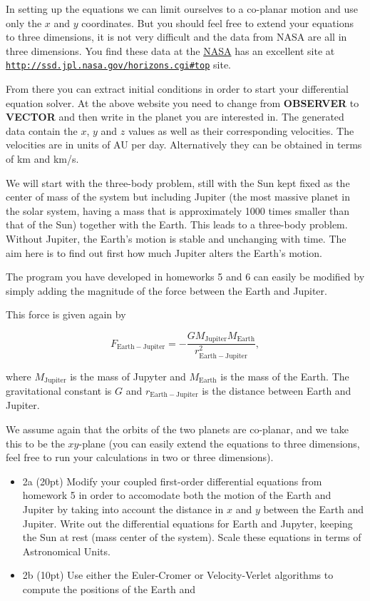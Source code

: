 \documentclass[%
oneside,                 %
final,                   %
10pt]{article}
\begin{document}
In setting up the equations we can limit ourselves to a co-planar
motion and use only the $x$ and $y$ coordinates. But you should feel
free to extend your equations to three dimensions, it is not very
difficult and the data from NASA are all in three dimensions.
You find these data at the 
\href{{http://www.nasa.gov/index.html}}{NASA} has an excellent site at \href{{http://ssd.jpl.nasa.gov/horizons.cgi#top}}{\nolinkurl{http://ssd.jpl.nasa.gov/horizons.cgi\#top}} site.

From there you can extract initial conditions in order to start your
differential equation solver.  At the above website you need to change
from \textbf{OBSERVER} to \textbf{VECTOR} and then write in the planet you are
interested in.  The generated data contain the $x$, $y$ and $z$ values
as well as their corresponding velocities. The velocities are in units
of AU per day.  Alternatively they can be obtained in terms of km and
km/s.

We will start with  the three-body problem, still with the Sun kept
fixed as the center of mass of the system but including Jupiter (the
most massive planet in the solar system, having a mass that is
approximately 1000 times smaller than that of the Sun) together with
the Earth. This leads to a three-body problem. Without Jupiter, the
Earth's motion is stable and unchanging with time. The aim here is to
find out first how much Jupiter alters the Earth's motion.


The program you have developed in homeworks 5 and 6 can easily be modified by
simply adding the magnitude of the force between the Earth and
Jupiter.

This force is given again by

\[
F_{\mathrm{Earth-Jupiter}}=-\frac{GM_{\mathrm{Jupiter}}M_{\mathrm{Earth}}}{r_{\mathrm{Earth-Jupiter}}^2},
\]

where $M_{\mathrm{Jupiter}}$ is the mass of Jupyter and
$M_{\mathrm{Earth}}$ is the mass of the Earth.  The gravitational constant
is $G$ and $r_{\mathrm{Earth-Jupiter}}$ is the distance between Earth
and Jupiter.

We assume again that the orbits of the two planets are co-planar, and
we take this to be the $xy$-plane (you can easily extend the equations
to three dimensions, feel free to run your calculations in two or three dimensions).

\begin{itemize}
\item 2a (20pt) Modify your coupled first-order differential equations from homework 5 in order to accomodate both the motion of the Earth and Jupiter by taking into account the distance in $x$ and $y$ between the Earth and Jupiter. Write out the differential equations for  Earth and Jupyter, keeping the Sun at rest (mass center of the system). Scale these equations in terms of Astronomical Units.

\item 2b (10pt) Use either the Euler-Cromer or Velocity-Verlet algorithms to compute the positions of the Earth and
\end{itemize}
\end{document}
